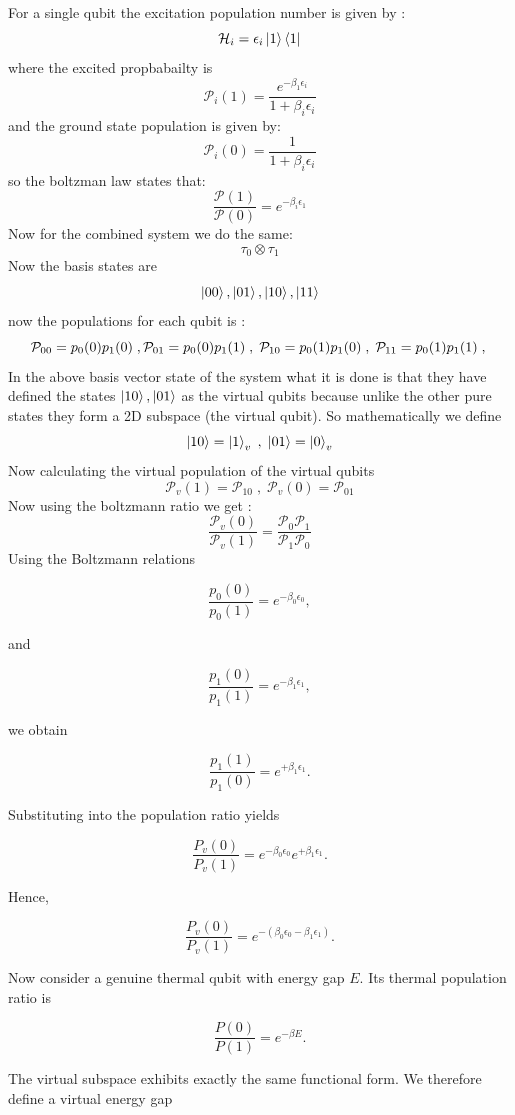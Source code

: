 \documentclass[11pt,a4paper]{article}
\theoremstyle{definition}
\theoremstyle{remark}
\begin{document}
For a single qubit the excitation population number is given by :
\[
\mathcal{H}_i = \epsilon_i\ket{1}\bra{1}
\] where the excited propbabailty is 
\[
\mathcal{P}_i(1) = \frac{e^{-\beta_1 \epsilon_i}}{1+\beta_i\epsilon_i} 
\] and the ground state population is given by:
\[
\mathcal{P}_i(0) = \frac{1}{1+\beta_i\epsilon_i}
\] so the boltzman law states that:
\[
\frac{\mathcal{P}(1)} {\mathcal{P}(0) }= e^{-\beta_i \epsilon_1}
\]
Now for the combined system we do the same:
\[
\tau_0
\otimes \tau_1\] Now the basis states are 
\[\ket{00} , \ket{01} , \ket{10} ,\ket{11}\] now the populations for each qubit is :
\[
\mathcal{P}_{00} = p_0(0)p_1(0) \; , \; \\
\mathcal{P}_{01} = p_0(0)p_1(1)\; , \;
\mathcal{P}_{10} = p_0(1)p_1(0)\; , \;
\mathcal{P}_{11} = p_0(1)p_1(1)\; , \;
\]
In the above basis vector state of the system what it is done is that they have defined the states \(\ket{10} , \ket{01}\) as the virtual qubits because unlike the other pure states they form a 2D subspace (the virtual qubit). So mathematically we define \[
\ket{10} = \ket{1}_v \; , \; \ket{01} = \ket{0}_v 
\]
Now calculating the virtual population of the virtual qubits 
\[\mathcal{P}_v(1) = \mathcal{P}_{10} \; , \; \mathcal{P}_v(0) = \mathcal{P}_{01}
\]
Now using the boltzmann ratio we get :
\[
\frac{\mathcal{P}_v(0)}{\mathcal{P}_v(1)}= \frac{\mathcal{P}_0 \mathcal{P}_1}{\mathcal{P}_1 \mathcal{P}_0}
\]
Using the Boltzmann relations

\[
\frac{p_0(0)}{p_0(1)}
=
e^{-\beta_0 \epsilon_0},
\]

and

\[
\frac{p_1(0)}{p_1(1)}
=
e^{-\beta_1 \epsilon_1},
\]

we obtain

\[
\frac{p_1(1)}{p_1(0)}
=
e^{+\beta_1 \epsilon_1}.
\]

Substituting into the population ratio yields

\[
\frac{P_v(0)}{P_v(1)}
=
e^{-\beta_0 \epsilon_0}
e^{+\beta_1 \epsilon_1}.
\]

Hence,

\[
\frac{P_v(0)}{P_v(1)}
=
e^{-(\beta_0\epsilon_0-\beta_1\epsilon_1)}.
\]

Now consider a genuine thermal qubit with energy gap \(E\). Its thermal population ratio is

\[
\frac{P(0)}{P(1)}
=
e^{-\beta E}.
\]

The virtual subspace exhibits exactly the same functional form. We therefore define a virtual energy gap
\end{document}
